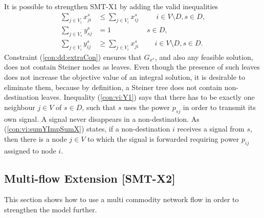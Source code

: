 It is possible to strengthen SMT-X1 by adding the valid inequalities
  \begin{subequations}[resume]
  \begin{flalign}
  \label{con:dd:extraCon} \sum\limits_{j\in V_{i}}x^s_{ji} & \leq \sum\limits_{j\in V_{i}}x^s_{ij}  \quad\quad ~~  	i\in V\setminus D, s\in D, \\	
 \label{con:vi:Y1}  \sum\limits_{j\in V_s}  y^{s}_{sj} & =1 \quad\quad\quad\quad\quad s\in D, \\
\label{con:vi:sumYImpSumX} \sum\limits_{j\in V_i }y^{s}_{ij} & \geq \sum\limits_{j\in V_i}  x^{s}_{ji} ~ \quad\quad   i\in V\setminus D, s\in D. 
\end{flalign}
  \end{subequations}
Constraint (\ref{con:dd:extraCon}) ensures that $G_{x^s}$, and also any feasible solution, does not contain Steiner nodes as leaves. Even though the presence of such leaves does not increase the objective value of an integral solution, it is desirable to eliminate them, because by definition, a Steiner tree does not contain non-destination leaves. Inequality (\ref{con:vi:Y1}) says that there has to be exactly one neighbour $j\in V$ of $s\in D$, such that $s$ uses the power $p_{sj}$ in order to transmit its own signal. A signal never disappears in a non-destination. As (\ref{con:vi:sumYImpSumX}) states, if a non-destination $i$ receives a signal from $s$, then there is a node $j\in V$ to which the signal is forwarded requiring power $p_{ij}$ assigned to node $i$.

\subsection{Multi-flow Extension [SMT-X2]}
This section shows how to use a multi commodity network flow in order to strengthen the model further.
